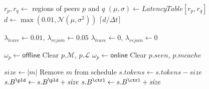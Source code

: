 \documentclass{article}
\begin{document}
\begin{algorithm}[H]
\caption{Network Delay Model}
\label{alg:delay}
\begin{algorithmic}[1]
    \State $r_p, r_q \gets$ regions of peers $p$ and $q$
    \State $(\mu, \sigma) \gets \mathit{LatencyTable}[r_p, r_q]$ 
    \State $d \gets \max(0.01, \mathcal{N}(\mu, \sigma^2))$ 
    \State \Return $\lceil d / \Delta t \rceil$ 
\EndFunction
\end{algorithmic}
\end{algorithm}


\begin{algorithm}[H]
\caption{Bimodal Churn Model}
\label{alg:churn}
\begin{algorithmic}[1]
        \State $\lambda_{\mathit{leave}} \gets 0.01$, \quad $\lambda_{\mathit{rejoin}} \gets 0.05$
    \Else
        \State $\lambda_{\mathit{leave}} \gets 0$, \quad $\lambda_{\mathit{rejoin}} \gets 0$ 
    \EndIf
    
        \State $\omega_p \gets \mathsf{offline}$
        \State Clear $p.\mathcal{M}$, $p.\mathcal{L}$ 
        \State $\omega_p \gets \mathsf{online}$
    \State Clear $p.\mathit{seen}$, $p.\mathit{mcache}$ 
    \EndIf
\EndFor
\EndProcedure
\end{algorithmic}
\end{algorithm}


\begin{algorithm}[H]
\caption{Bandwidth Enforcement}
\label{alg:bandwidth}
\begin{algorithmic}[1]
    \State $\mathit{size} \gets |m|$ 
        \State Remove $m$ from schedule 
    \Else
        \State $s.\mathit{tokens} \gets s.\mathit{tokens} - \mathit{size}$
            \State $s.B^{\pld} \gets s.B^{\pld} + \mathit{size}$
        \Else
            \State $s.B^{\ctrl} \gets s.B^{\ctrl} + \mathit{size}$
        \EndIf
    \EndIf
\EndFor
\EndProcedure
\end{algorithmic}
\end{algorithm}
\end{document}
